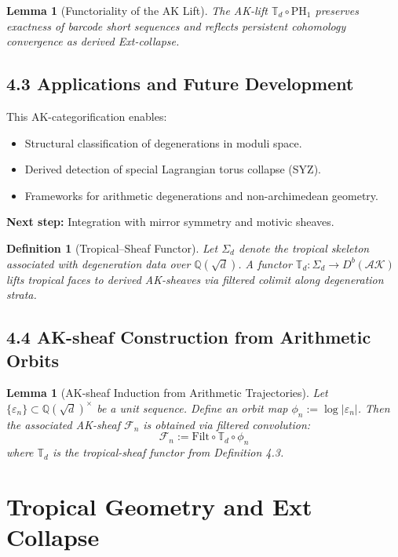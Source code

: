 \documentclass[11pt]{article}
\newtheorem{definition}[theorem]{Definition}
\newtheorem{lemma}[theorem]{Lemma}
\begin{document}
\begin{lemma}[Functoriality of the AK Lift]
The AK-lift $\mathbb{T}_d \circ \mathrm{PH}_1$ preserves exactness of barcode short sequences and reflects persistent cohomology convergence as derived Ext-collapse.
\end{lemma}

\subsection{4.3 Applications and Future Development}

This AK-categorification enables:
\begin{itemize}
    \item Structural classification of degenerations in moduli space.
    \item Derived detection of special Lagrangian torus collapse (SYZ).
    \item Frameworks for arithmetic degenerations and non-archimedean geometry.
\end{itemize}

\textbf{Next step:} Integration with mirror symmetry and motivic sheaves.

\begin{definition}[Tropical--Sheaf Functor]
Let $\Sigma_d$ denote the tropical skeleton associated with degeneration data over $\mathbb{Q}(\sqrt{d})$.
A functor $\mathbb{T}_d : \Sigma_d \to D^b(\mathcal{AK})$ lifts tropical faces to derived AK-sheaves via filtered colimit along degeneration strata.
\end{definition}

\subsection{4.4 AK-sheaf Construction from Arithmetic Orbits}

\begin{lemma}[AK-sheaf Induction from Arithmetic Trajectories]
Let $\{\varepsilon_n\} \subset \mathbb{Q}(\sqrt{d})^\times$ be a unit sequence.
Define an orbit map $\phi_n := \log|\varepsilon_n|$.
Then the associated AK-sheaf $\mathcal{F}_n$ is obtained via filtered convolution:
\[
\mathcal{F}_n := \mathrm{Filt} \circ \mathbb{T}_d \circ \phi_n
\]
where $\mathbb{T}_d$ is the tropical-sheaf functor from Definition 4.3.
\end{lemma}


\section{Tropical Geometry and Ext Collapse}
\end{document}

